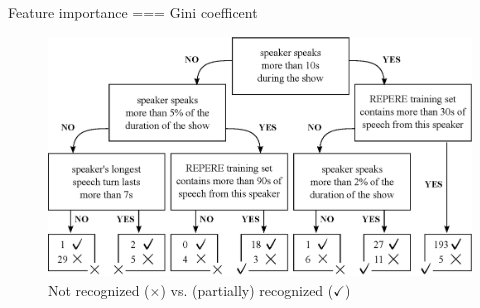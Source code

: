 Feature importance === Gini coefficent~\cite{Breiman2001}


\begin{figure}[t]
\centering
\includegraphics[width=\linewidth]{figures/tree.eps}
\caption{Not recognized ($\times$) vs. (partially) recognized ($\checkmark$)}
\label{fig:tree}
\end{figure}
